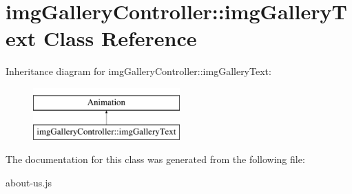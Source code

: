 \hypertarget{classimgGalleryController_1_1imgGalleryText}{\section{img\-Gallery\-Controller\-:\-:img\-Gallery\-Text Class Reference}
\label{classimgGalleryController_1_1imgGalleryText}
}
Inheritance diagram for img\-Gallery\-Controller\-:\-:img\-Gallery\-Text\-:\begin{figure}[H]
\begin{center}
\leavevmode
\includegraphics[height=2.000000cm]{classimgGalleryController_1_1imgGalleryText}
\end{center}
\end{figure}


The documentation for this class was generated from the following file\-:\begin{DoxyCompactItemize}
\item 
about-\/us.\-js\end{DoxyCompactItemize}
